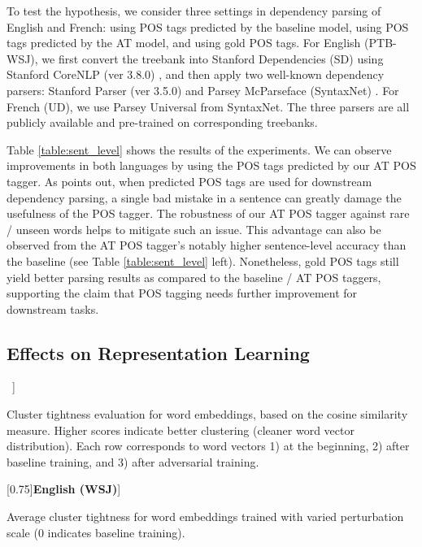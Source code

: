 \documentclass[11pt,a4paper]{article}
\begin{document}
To test the hypothesis, we consider three settings in dependency parsing of English and French: using POS tags predicted by the baseline model, using POS tags predicted by the AT model, and using gold POS tags. 
For English (PTB-WSJ), we first convert the treebank into Stanford Dependencies (SD) using Stanford CoreNLP (ver 3.8.0) \cite{manning-EtAl:2014:P14-5}, and then apply two well-known dependency parsers:
Stanford Parser (ver 3.5.0) \cite{chen2014fast} and Parsey McParseface (SyntaxNet) \cite{andor2016globally}.
For French (UD),
we use Parsey Universal from SyntaxNet.
The three parsers are all publicly available and pre-trained on corresponding treebanks.

Table \ref{table:sent_level} shows the results of the experiments. We can observe improvements in both languages by using the POS tags predicted by our AT POS tagger. 
As  points out, when predicted POS tags are used for downstream dependency parsing, a single bad mistake in a sentence can greatly damage the usefulness of the POS tagger.
The robustness of our AT POS tagger against rare \!/\! unseen words helps to mitigate such an issue.
This advantage can also be observed from the AT POS tagger's notably higher sentence-level accuracy than the baseline (see Table \ref{table:sent_level} left).
Nonetheless, gold POS tags still yield better parsing results as compared to the baseline \!/\! AT POS taggers, supporting the claim that POS tagging needs further improvement for downstream tasks.




\subsection{Effects on Representation Learning}
\label{representation_Analysis}

\begin{table}[t]
\setlength{\extrarowheight}{0pt}
~\-1mm]
\caption{
Cluster tightness evaluation for word embeddings, based on the cosine similarity measure.
Higher scores
indicate better clustering (cleaner word vector distribution).
Each row corresponds to word vectors 1) at the beginning, 2) after baseline training, and 3) after adversarial training.
}
\label{tbl:cluster_tightness}
\vspace{-0mm}
\end{table}


\begin{table}[t]
\setlength{\extrarowheight}{0pt}

\scalebox{0.75}[0.75]{{\bf English (WSJ)}}\-2mm]

\caption{Average cluster tightness for word embeddings 
trained with varied perturbation scale  (0 indicates baseline training). }
\label{tbl:cluster_tightness_epsilon}
\vspace{-4mm}
\end{table}
\end{document}

